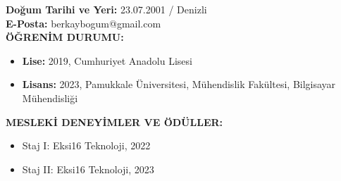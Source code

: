 \vspace{-3mm}
\textbf{Do{\u g}um Tarihi ve Yeri:} 23.07.2001 / Denizli  \\

\vspace{-3mm}
\textbf{E-Posta:} berkaybogum@gmail.com \\


\textbf{ÖĞRENİM DURUMU:} 
\vspace{-3mm}
\begin{itemize}
    \item \textbf{Lise:} 2019, Cumhuriyet Anadolu Lisesi
  \item \textbf{Lisans:} 2023, Pamukkale Üniversitesi, Mühendislik Fakültesi, Bilgisayar Mühendisliği
\end{itemize}

\textbf{MESLEKİ DENEYİMLER VE ÖDÜLLER:}   
\vspace{-3mm}
\begin{itemize}
  \item Staj I: Eksi16 Teknoloji, 2022
  \item Staj II: Eksi16 Teknoloji, 2023
\end{itemize}


